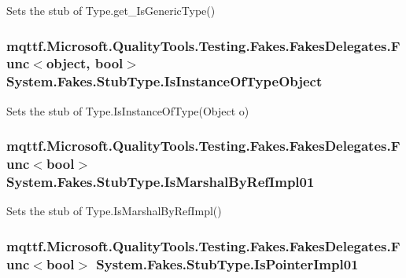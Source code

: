 Sets the stub of Type.\-get\-\_\-\-Is\-Generic\-Type()

\hypertarget{class_system_1_1_fakes_1_1_stub_type_abb378515dd5acf3013b7ca78b4ebe9a7}{
\subsubsection[{Is\-Instance\-Of\-Type\-Object}]{\setlength{\rightskip}{0pt plus 5cm}mqttf.\-Microsoft.\-Quality\-Tools.\-Testing.\-Fakes.\-Fakes\-Delegates.\-Func$<$object, bool$>$ System.\-Fakes.\-Stub\-Type.\-Is\-Instance\-Of\-Type\-Object}}\label{class_system_1_1_fakes_1_1_stub_type_abb378515dd5acf3013b7ca78b4ebe9a7}


Sets the stub of Type.\-Is\-Instance\-Of\-Type(\-Object o)

\hypertarget{class_system_1_1_fakes_1_1_stub_type_a4f943f3aad45bdfcde1990f9328c242a}{
\subsubsection[{Is\-Marshal\-By\-Ref\-Impl01}]{\setlength{\rightskip}{0pt plus 5cm}mqttf.\-Microsoft.\-Quality\-Tools.\-Testing.\-Fakes.\-Fakes\-Delegates.\-Func$<$bool$>$ System.\-Fakes.\-Stub\-Type.\-Is\-Marshal\-By\-Ref\-Impl01}}\label{class_system_1_1_fakes_1_1_stub_type_a4f943f3aad45bdfcde1990f9328c242a}


Sets the stub of Type.\-Is\-Marshal\-By\-Ref\-Impl()

\hypertarget{class_system_1_1_fakes_1_1_stub_type_a8ad9ba6ba484b149409b5467b6b3a871}{
\subsubsection[{Is\-Pointer\-Impl01}]{\setlength{\rightskip}{0pt plus 5cm}mqttf.\-Microsoft.\-Quality\-Tools.\-Testing.\-Fakes.\-Fakes\-Delegates.\-Func$<$bool$>$ System.\-Fakes.\-Stub\-Type.\-Is\-Pointer\-Impl01}}\label{class_system_1_1_fakes_1_1_stub_type_a8ad9ba6ba484b149409b5467b6b3a871}


